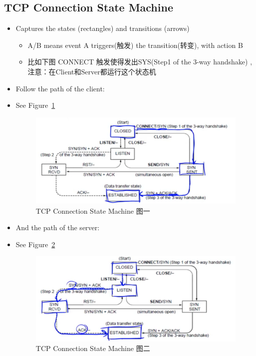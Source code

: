 \documentclass[12pt]{ctexart}   %
\begin{document}
	\subsection{TCP Connection State Machine}
	\begin{itemize}
		\item Captures the states (rectangles) and transitions (arrows)
		\begin{itemize}
			\item A/B means event A triggers(触发) the transition(转变), with action B
			\item 比如下图 CONNECT 触发使得发出SYS(Step1  of the 3-way handshake) ,注意：在Client和Server都运行这个状态机
		\end{itemize}
		
		\item Follow the path of the client:
		\item See Figure~\ref{fig:6-3-4}
		 
		 \begin{figure}[h!] %
		\centering
		 \includegraphics[scale=0.7]{images/6-3-4}
		\caption{ TCP Connection State Machine 图一 }
		 \label{fig:6-3-4}
		 \end{figure}
		 
		 \item And the path of the server:
		 \item See Figure~\ref{fig:6-3-5}
		 
		 \begin{figure}[h!] %
		\centering
		 \includegraphics[scale=0.7]{images/6-3-5}
		\caption{ TCP Connection State Machine 图二 }
		 \label{fig:6-3-5}
		 \end{figure}
		 

\end{itemize}
\end{document}
